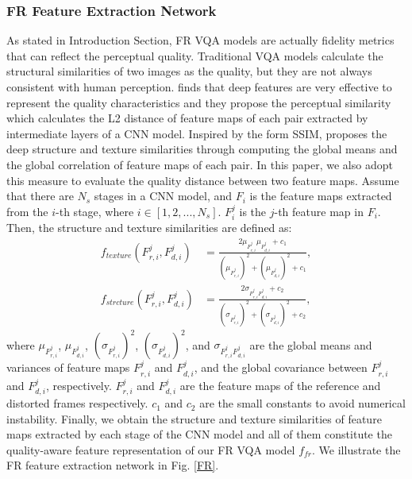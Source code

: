 \documentclass{article}
\begin{document}
\subsubsection{FR Feature Extraction Network}
As stated in Introduction Section, FR VQA models are actually fidelity metrics that can reflect the perceptual quality. Traditional VQA models calculate the structural similarities of two images as the quality, but they are not always consistent with human perception. \cite{zhang2018unreasonable} finds that deep features are very effective to represent the quality characteristics and they propose the perceptual similarity which calculates the L2 distance of feature maps of each pair extracted by intermediate layers of a CNN model. Inspired by the form SSIM, \cite{ding2020image} proposes the deep structure and texture similarities through computing the global means and the global correlation of feature maps of each pair. In this paper, we also adopt this measure to evaluate the quality distance between two feature maps.
Assume that there are $N_s$ stages in a CNN model, and $F_{i}$ is the feature maps extracted from the $i$-th stage, where $i\in [1, 2, ..., N_s]$. $F_{i}^{j}$ is the $j$-th feature map in $F_{i}$. Then, the structure and texture similarities are defined as:
\begin{equation}
\begin{aligned}
f_{texture}\left(F_{r,i}^{j}, F_{d,i}^{j}\right) &=\frac{2 \mu_{F_{r,i}^{j}} \mu_{F_{d,i}^{j}}+c_{1}}{(\mu_{F_{r,i}^{j}})^2+(\mu_{F_{d,i}^{j}})^2+c_{1}}, \\
f_{strcture}\left(F_{r,i}^{j}, F_{d,i}^{j}\right) &=\frac{2 \sigma_{F_{r,i}^{j} F_{d,i}^{j}}+c_{2}}{(\sigma_{F_{r,i}^{j}})^2+(\sigma_{F_{d,i}^{j}})^2+c_{2}},
\end{aligned}
\end{equation}
where $ \mu_{F_{r,i}^{j}}$, $\mu_{F_{d,i}^{j}}$, $(\sigma_{F_{r,i}^{j}})^2$, $(\sigma_{F_{d,i}^{j}})^2$, and $\sigma_{F_{r,i}^{j} F_{d,i}^{j}}$ are the global means and variances of feature maps $F_{r,i}^{j}$ and $F_{d,i}^{j}$, and the global covariance between  $F_{r,i}^{j}$ and $F_{d,i}^{j}$, respectively. $F_{r,i}^{j}$ and $F_{d,i}^{j}$ are the feature maps of the reference and distorted frames respectively. $c_{1}$ and $c_{2}$ are the small constants to avoid numerical instability. Finally, we obtain the structure and texture similarities of feature maps extracted by each stage of the CNN model and all of them constitute the quality-aware feature representation of our FR VQA model $f_{fr}$. We illustrate the FR feature extraction network in Fig. \ref{FR}.
\end{document}
